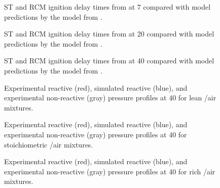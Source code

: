 \documentclass[../main.tex]{subfiles}
\begin{document}
\begin{figure}
        {\caption{ST and RCM ignition delay times from
        \textcite{Tsujimura2012} at \SI{7}{\atmosphere} compared
        with model predictions by the model from \textcite{Sarathy2013}.}
        \label{fig:ipeoh-7bar}}
    \par
    \vspace{10pt}
        {\caption{ST and RCM ignition delay times from
        \textcite{Tsujimura2012} at \SI{20}{\atmosphere} compared
        with model predictions by the model from \textcite{Sarathy2013}.}
        \label{fig:ipeoh-20bar}}
\end{figure}
\begin{figure}
        {\caption{ST and RCM ignition delay times from
        \textcite{Sarathy2013} at \SI{40}{\atmosphere} compared
        with model predictions by the model from \textcite{Sarathy2013}.}
        \label{fig:ipeoh-40bar}}
    \par
    \vspace{10pt}
        {\caption{Experimental reactive (red), simulated reactive
        (blue), and experimental non-reactive (gray) pressure
        profiles at \SI{40}{\atmosphere} for lean \iPeOH{}/air mixtures.}
        \label{fig:ipeoh-phi05}}
\end{figure}
\begin{figure}
        {\caption{Experimental reactive (red), simulated reactive
        (blue), and experimental non-reactive (gray) pressure
        profiles at \SI{40}{\atmosphere} for stoichiometric \iPeOH{}/air mixtures.}
        \label{fig:ipeoh-phi10}}
    \par
    \vspace{10pt}
        {\caption{Experimental reactive (red), simulated reactive
        (blue), and experimental non-reactive (gray) pressure
        profiles at \SI{40}{\atmosphere} for rich \iPeOH{}/air mixtures.}
        \label{fig:ipeoh-phi20}}
\end{figure}
\end{document}
